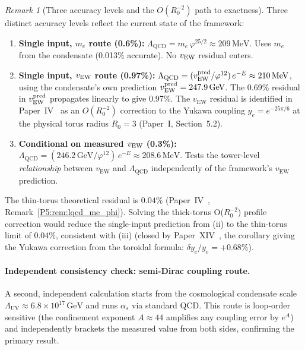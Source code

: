 \documentclass[11pt,a4paper]{article}
\theoremstyle{definition}
\theoremstyle{remark}
\newtheorem{remark}[theorem]{Remark}
\newcommand{\vp}{\varphi}
\newcommand{\vEW}{v_{\mathrm{EW}}}
\newcommand{\LUV}{\Lambda_{\mathrm{UV}}}
\newcommand{\LQCD}{\Lambda_{\mathrm{QCD}}}
\begin{document}
\begin{remark}[Three accuracy levels and the $O(R_0^{-2})$ path to exactness]
\label{P5:rem:lqcd_accuracy_levels}
Three distinct accuracy levels reflect the current state of the framework:
\begin{enumerate}[noitemsep,label=(\roman*)]
\item \textbf{Single input, $m_e$ route (0.6\%):}
  $\LQCD = m_e\,\vp^{25/2}\approx209\,\mathrm{MeV}$.
  Uses $m_e$ from the condensate (0.013\% accurate).
  No $v_{\rm EW}$ residual enters.

\item \textbf{Single input, $v_{\rm EW}$ route (0.97\%):}
  $\LQCD = (\vEW^{\rm pred}/\vp^{12})\,e^{-E}\approx210\,\mathrm{MeV}$,
  using the condensate's own prediction $\vEW^{\rm pred}=247.9\,\mathrm{GeV}$.
  The 0.69\% residual in $\vEW^{\rm pred}$ propagates linearly to give 0.97\%.
  The $\vEW$ residual is identified in Paper~IV~\cite{Paper4} as an
  $O(R_0^{-2})$ correction to the Yukawa coupling $y_e = e^{-25\pi/6}$
  at the physical torus radius $R_0 = 3$ (Paper~I, Section~5.2).

\item \textbf{Conditional on measured $v_{\rm EW}$ (0.3\%):}
  $\LQCD = (246.2\,\mathrm{GeV}/\vp^{12})\,e^{-E}\approx208.6\,\mathrm{MeV}$.
  Tests the tower-level \emph{relationship} between $\vEW$ and $\LQCD$
  independently of the framework's $\vEW$ prediction.
\end{enumerate}
The thin-torus theoretical residual is $0.04\%$
(Paper~IV~\cite{Paper4}, Remark~\ref{P5:rem:lqcd_me_phi}).
Solving the thick-torus O($R_0^{-2}$) profile correction would reduce
the single-input prediction from (ii) to the thin-torus limit of
$0.04\%$, consistent with (iii) (closed by Paper~XIV~\cite{Paper14},
the corollary giving the Yukawa correction from the toroidal formula:
$\delta y_e/y_e=+0.68\%$). %
\end{remark}

\paragraph{Independent consistency check: semi-Dirac coupling route.}
A second, independent calculation starts from the cosmological condensate
scale $\LUV\approx6.8\times10^{17}\,\mathrm{GeV}$ and runs $\alpha_s$ via
standard QCD. This route is loop-order sensitive (the confinement exponent
$A\approx44$ amplifies any coupling error by $e^A$) and independently
brackets the measured value from both sides, confirming the primary result.
\end{document}
